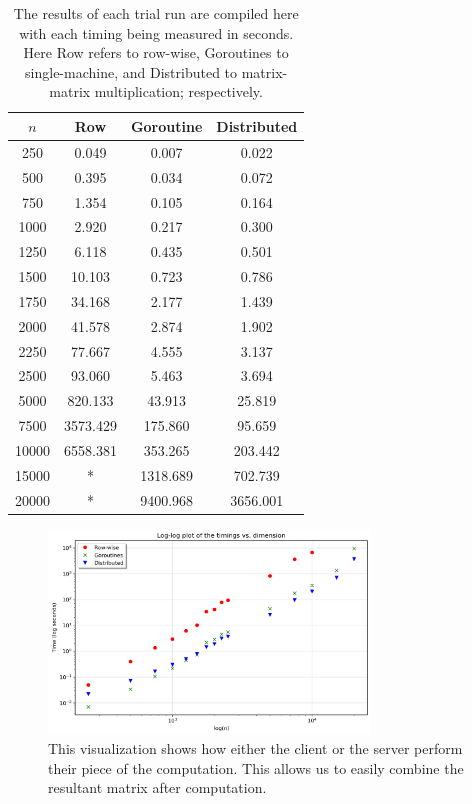 \documentclass[12pt]{article}
\begin{document}
			\begin{table}
				\centering
				\begin{tabular}{|c||c|c|c|}
					\hline
					  $n$&     Row  &Goroutine&Distributed\\\hline\hline
					  250&    0.049 &   0.007 &  0.022\\\hline
					  500&    0.395 &   0.034 &  0.072\\\hline
					  750&    1.354 &   0.105 &  0.164\\\hline
					 1000&    2.920 &   0.217 &  0.300\\\hline
					 1250&    6.118 &   0.435 &  0.501\\\hline
					 1500&   10.103 &   0.723 &   0.786\\\hline
					 1750&   34.168 &   2.177 &   1.439\\\hline
					 2000&   41.578 &   2.874 &   1.902\\\hline
					 2250&   77.667 &   4.555 &   3.137\\\hline
					 2500&   93.060 &   5.463 &   3.694\\\hline
					 5000&  820.133 &  43.913 &  25.819\\\hline
					 7500& 3573.429 & 175.860 &  95.659\\\hline
					10000& 6558.381 & 353.265 & 203.442\\\hline
					15000&     *    &1318.689 & 702.739\\\hline
					20000&     *    &9400.968 & 3656.001\\\hline
				\end{tabular}
				\caption{The results of each trial run are compiled here with each timing being measured in seconds. Here Row refers to row-wise, Goroutines to single-machine, and Distributed to matrix-matrix multiplication; respectively.}
				\label{tab:results}
			\end{table}
		
			\begin{figure}
				\centering\includegraphics[width=0.7618\textwidth]{../imgs/results}
				\caption{This visualization shows how either the client or the server perform their piece of the computation. This allows us to easily combine the resultant matrix after computation.}
				\label{fig:results}
			\end{figure}
		
\end{document}
